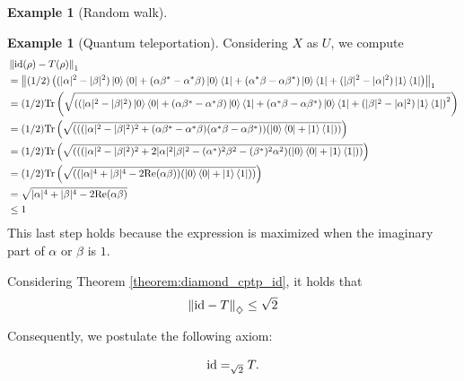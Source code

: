 \documentclass[10pt,a4paper]{amsart}
\theoremstyle{definition}
\theoremstyle{definition}
\newtheorem{example}[definition]{Example}
\theoremstyle{definition}
\theoremstyle{definition}
\theoremstyle{definition}
\theoremstyle{definition}
\begin{document}
\begin{example}[Random walk]
\begin{example}[Quantum teleportation]
Considering $X$ as $U$, we compute
\begin{align*}
  &\left\lVert  \mathrm{id}(\rho) - T(\rho) \right\rVert_{1} \\
  & = \left\lVert  (1/2) \left( (|\alpha|^2 -|\beta|^2) \ket{0}\bra{0} + (\alpha \beta^*-\alpha^* \beta)\ket{0}\bra{1} + (\alpha^* \beta-\alpha \beta^*)\ket{0}\bra{1} + (|\beta|^2 -|\alpha|^2 )\ket{1}\bra{1}   \right) \right\rVert_{1} \\
  & = (1/2) \text{Tr} \left( \sqrt{\left( (|\alpha|^2 -|\beta|^2) \ket{0}\bra{0} + (\alpha \beta^*-\alpha^* \beta)\ket{0}\bra{1} + (\alpha^* \beta-\alpha \beta^*)\ket{0}\bra{1} + (|\beta|^2 -|\alpha|^2 )\ket{1}\bra{1}   \right)^2}\right) \\
  & = (1/2) \text{Tr} \left( \sqrt{\left( ((|\alpha|^2 -|\beta|^2 )^2 + (\alpha \beta^*-\alpha^* \beta)(\alpha^* \beta-\alpha \beta^*))  (\ket{0}\bra{0} + \ket{1}\bra{1})  \right)}\right)  \\
  & = (1/2) \text{Tr} \left( \sqrt{\left( ((|\alpha|^2 -|\beta|^2 )^2 + 2|\alpha|^2|\beta|^2 - (\alpha^{*})^{2}\beta^2 -  (\beta^{*})^{2}\alpha^2 )  (\ket{0}\bra{0} + \ket{1}\bra{1})  \right)}\right) \\
  & = (1/2) \text{Tr} \left( \sqrt{\left( (|\alpha|^4+ |\beta|^4 - 2 \text{Re}(\alpha \beta) )  (\ket{0}\bra{0} + \ket{1}\bra{1})  \right)}\right) \\
  & =  \sqrt{|\alpha|^4+ |\beta|^4 - 2 \text{Re}(\alpha \beta)} \\
  & \leq 1
\end{align*}
This last step holds because the expression is maximized when the imaginary part of $\alpha$ or $\beta$ is $1$.

Considering Theorem \ref{theorem:diamond_cptp_id}, it holds that
\begin{align*}
  \left\lVert  \mathrm{id} - T \right\rVert_{\diamondsuit} \leq \sqrt{2}
\end{align*}

Consequently, we postulate the following axiom:

    \begin{align} \label{eq:t_teleport}
        \mathrm{id} =_{ \sqrt{2}} T.
    \end{align}


\end{example}
\end{example}
\end{document}
